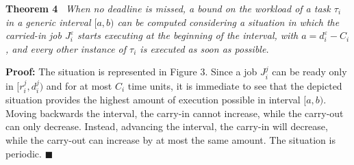 \textbf{Theorem 4} \ \textit{When no deadline is missed, a bound on the workload of a task $\tau_i$ in a generic interval $[a,b)$ can be computed considering a situation in which the carried-in job $J_i^\varepsilon$ starts executing at the beginning of the interval, with $a = d_i^\varepsilon - C_i$, and every other instance of $\tau_i$ is executed as soon as possible.}

\bigskip

\noindent
\textbf{Proof:} The situation is represented in Figure 3. Since a job $J_i^j$ can be ready only in $[r_i^j, d_i^j)$ and for at most $C_i$ time units, it is immediate to see that the depicted situation provides the highest amount of execution possible in interval $[a,b)$. Moving backwards the interval, the carry-in cannot increase, while the carry-out can only decrease. Instead, advancing the interval, the carry-in will decrease, while the carry-out can increase by at most the same amount. The situation is periodic. \hfill $\blacksquare$